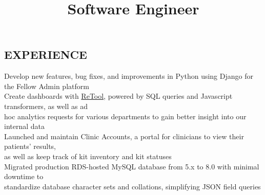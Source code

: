 \documentclass[resmargin]{res}
\begin{document}
\begin{resume}
\section{EXPERIENCE}
\title{\textbf{Software Engineer}}
\begin{position}
\hspace*{5mm}\textbullet\hspace*{1.5mm}Develop new features, bug fixes, and improvements in Python using Django for the Fellow Admin platform\\
\hspace*{5mm}\textbullet\hspace*{1.5mm}Create dashboards with \href{https://retool.com/}{ReTool}, powered by SQL queries and Javascript transformers, as well as ad
\\\hspace*{8.5mm}hoc analytics requests for various departments to gain better insight into our internal data\\
\hspace*{5mm}\textbullet\hspace*{1.5mm}Launched and maintain Clinic Accounts, a portal for clinicians to view their patients' results,
\\\hspace*{8.5mm}as well as keep track of kit inventory and kit statuses\\
\hspace*{5mm}\textbullet\hspace*{1.5mm}Migrated production RDS-hosted MySQL database from 5.x to 8.0 with minimal downtime to
\\\hspace*{8.5mm}standardize database character sets and collations, simplifying JSON field queries
\end{position}



\end{resume}
\end{document}
